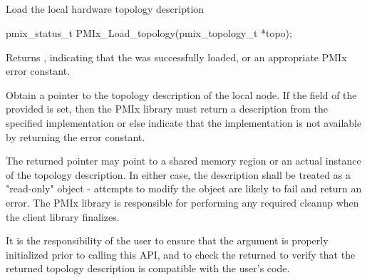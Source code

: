 \subsection{}

\summary

Load the local hardware topology description

\format

\cspecificstart
\begin{codepar}
pmix_status_t
PMIx_Load_topology(pmix_topology_t *topo);
\end{codepar}
\cspecificend

\begin{arglist}
\end{arglist}

Returns , indicating that the  was successfully loaded, or an appropriate \ac{PMIx} error constant.

\descr

Obtain a pointer to the topology description of the local node. If the
 field of the provided  is set, then
the \ac{PMIx} library must return a description from the specified
implementation or else indicate that the implementation is not available by
returning the  error constant.

The returned pointer may point to a shared memory region or an actual instance
of the topology description. In either case, the description shall be treated
as a "read-only" object - attempts to modify the object are likely to fail and
return an error. The \ac{PMIx} library is responsible for performing any required cleanup when the client library finalizes.

\adviceuserstart
It is the responsibility of the user to ensure that the  argument
is properly initialized prior to calling this \ac{API}, and to check the
returned  to verify that the returned topology description is
compatible with the user's code.
\adviceuserend

\subsection{}

